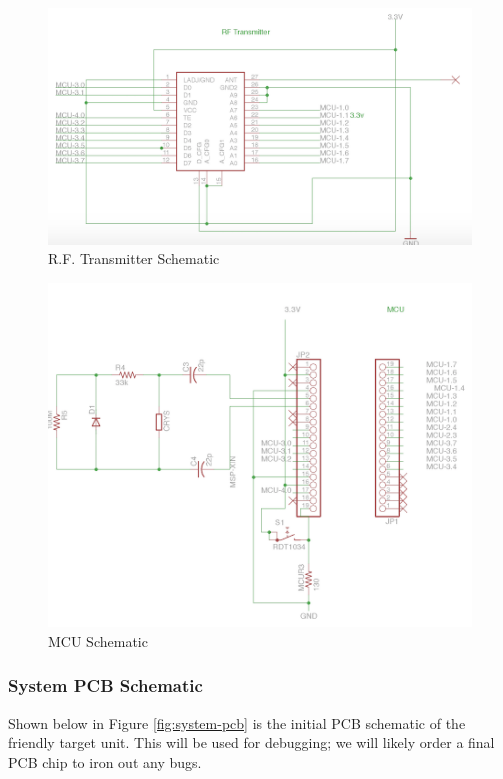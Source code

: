 \documentclass[letterpaper,10pt]{article}
\begin{document}
\begin{spacing}{1.15}
\begin{figure} [H]
	\centering
	\includegraphics[scale=0.70]{rf-transmitter.png}
	\caption{R.F. Transmitter Schematic \label{fig:transmitter-schematic}}
\end{figure}

\begin{figure} [H]
	\centering
	\includegraphics[scale=0.75]{mcu.png}
	\caption{MCU Schematic\label{fig:msp-schematic}}
\end{figure}


\subsubsection{System PCB Schematic}
Shown below in Figure \ref{fig:system-pcb} is the initial PCB schematic of the friendly target unit. This will be used for debugging; we will likely order a final PCB chip to iron out any bugs. 


\end{spacing}
\end{document}
